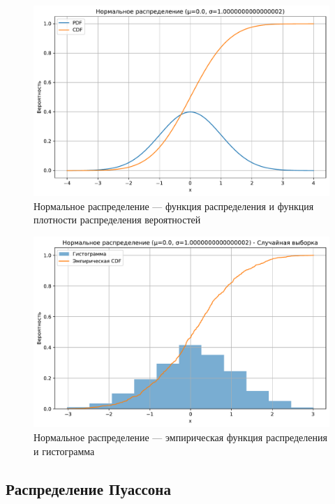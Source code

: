 \documentclass[a4paper,oneside,14pt]{extarticle}
\begin{document}
\begin{figure}[H]
	\centering
	\includegraphics[scale=0.7]{img/th_normal.pdf}
	\caption{Нормальное распределение --- функция распределения и функция плотности распределения вероятностей}
	\label{fig:}
\end{figure}

\begin{figure}[H]
	\centering
	\includegraphics[scale=0.7]{img/emp_normal.pdf}
	\caption{Нормальное распределение --- эмпирическая функция распределения и гистограмма}
	\label{fig:}
\end{figure}

\subsection{Распределение Пуассона}
\end{document}
